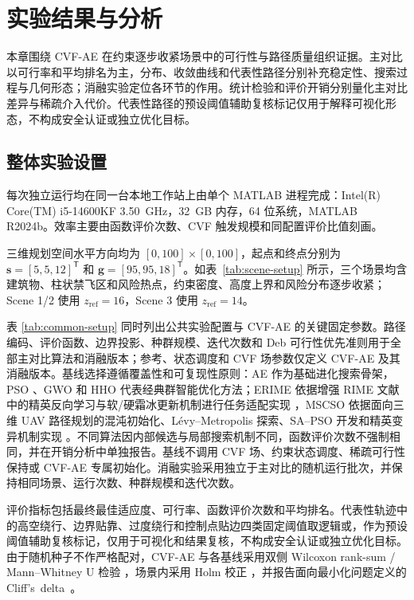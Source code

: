 \section{实验结果与分析}
\label{sec:results-discussion}

本章围绕 CVF-AE 在约束逐步收紧场景中的可行性与路径质量组织证据。主对比以可行率和平均排名为主，分布、收敛曲线和代表性路径分别补充稳定性、搜索过程与几何形态；消融实验定位各环节的作用。统计检验和评价开销分别量化主对比差异与稀疏介入代价。代表性路径的预设阈值辅助复核标记仅用于解释可视化形态，不构成安全认证或独立优化目标。

\subsection{整体实验设置}
\label{sec:experimental-setup}

每次独立运行均在同一台本地工作站上由单个 MATLAB 进程完成：Intel(R) Core(TM) i5-14600KF \SI{3.50}{GHz}，\SI{32}{GB} 内存，64 位系统，MATLAB R2024b。效率主要由函数评价次数、CVF 触发规模和同配置评价比值刻画。

三维规划空间水平方向均为 $[0,100]\times[0,100]$，起点和终点分别为 $\mathbf{s}=[5,5,12]^\mathsf{T}$ 和 $\mathbf{g}=[95,95,18]^\mathsf{T}$。如表~\ref{tab:scene-setup} 所示，三个场景均含建筑物、柱状禁飞区和风险热点，约束密度、高度上界和风险分布逐步收紧；Scene 1/2 使用 $z_{\mathrm{ref}}=16$，Scene 3 使用 $z_{\mathrm{ref}}=14$。

表 \ref{tab:common-setup} 同时列出公共实验配置与 CVF-AE 的关键固定参数。路径编码、评价函数、边界投影、种群规模、迭代次数和 Deb 可行性优先准则用于全部主对比算法和消融版本；参考、状态调度和 CVF 场参数仅定义 CVF-AE 及其消融版本。基线选择遵循覆盖性和可复现性原则：AE 作为基础进化搜索骨架，PSO \citep{Kennedy1995PSO}、GWO \citep{Mirjalili2014GWO} 和 HHO \citep{Heidari2019HHO} 代表经典群智能优化方法；ERIME 依据增强 RIME 文献中的精英反向学习与软/硬霜冰更新机制进行任务适配实现 \citep{Xie2024ELRIME}，MSCSO 依据面向三维 UAV 路径规划的混沌初始化、L\'{e}vy--Metropolis 探索、SA--PSO 开发和精英变异机制实现 \citep{Zhan2025MSCSO}。不同算法因内部候选与局部搜索机制不同，函数评价次数不强制相同，并在开销分析中单独报告。基线不调用 CVF 场、约束状态调度、稀疏可行性保持或 CVF-AE 专属初始化。消融实验采用独立于主对比的随机运行批次，并保持相同场景、运行次数、种群规模和迭代次数。

评价指标包括最终最佳适应度、可行率、函数评价次数和平均排名。代表性轨迹中的高空绕行、边界贴靠、过度绕行和控制点贴边四类固定阈值取逻辑或，作为预设阈值辅助复核标记，仅用于可视化和结果复核，不构成安全认证或独立优化目标。由于随机种子不作严格配对，CVF-AE 与各基线采用双侧 Wilcoxon rank-sum / Mann--Whitney U 检验 \citep{Mann1947RankSum}，场景内采用 Holm 校正 \citep{Holm1979Sequential}，并报告面向最小化问题定义的 Cliff's~delta~\citep{Cliff1993Dominance}。

